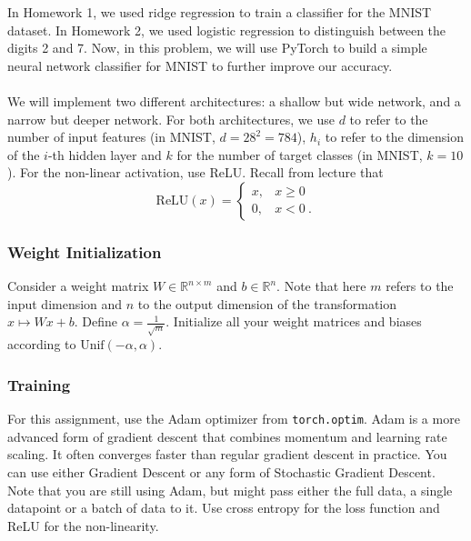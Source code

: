 \documentclass{article}
\begin{document}
\begin{aprob}
    \label{code-nn-mnist}
    In Homework 1, we used ridge regression to train a classifier for the MNIST dataset.
    In Homework 2, we used logistic regression to distinguish between the digits 2 and 7.
    Now, in this problem, we will use PyTorch to build a simple neural network classifier for MNIST to further improve our accuracy.\\\\
    We will implement two different architectures: a shallow but wide network, and a narrow but deeper network. For both architectures,
    we use $d$ to refer to the number of input features (in MNIST, $d=28^2 = 784$), $h_i$ to refer to the dimension of the $i$-th hidden layer and $k$ for the number of target classes (in MNIST, $k=10$). For the non-linear activation, use ReLU. Recall from lecture that
    \[ \text{ReLU}(x) = \begin{cases} 
          x, & x \geq 0 \\
          0, & x < 0 \ .
       \end{cases}
    \]
    \subsubsection*{Weight Initialization}
    Consider a weight matrix $W \in \mathbb{R}^{n \times m}$ and $b \in \mathbb{R}^n$. Note that here $m$ refers to the input dimension and
    $n$ to the output dimension of the transformation $x \mapsto Wx + b$. Define $\alpha = \frac{1}{\sqrt{m}}$.
    Initialize all your weight matrices and biases according to $\text{Unif}(-\alpha, \alpha)$.
    
    \subsubsection*{Training}
    For this assignment, use the Adam optimizer from \texttt{torch.optim}. Adam is a more advanced form of gradient descent that combines momentum and learning rate scaling. It often converges faster than regular gradient descent in practice. You can use either Gradient Descent or any form of Stochastic Gradient Descent. Note that you are still using Adam, but might pass either the full data, a single datapoint or a batch of data to it. Use cross entropy for the loss function and ReLU for the non-linearity.

\end{aprob}
\end{document}
